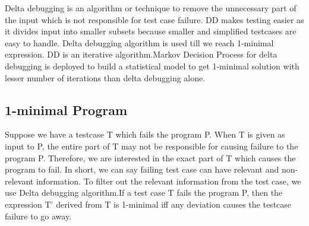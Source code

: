 \documentclass{relatorio}
\begin{document}
Delta debugging is an algorithm or technique to remove the unnecessary part of the input which is not responsible for test case failure. DD makes testing easier as it divides input into smaller subsets because smaller  and simplified testcases are easy to handle. Delta debugging algorithm is used till we reach 1-minimal expression. DD is an iterative algorithm.Markov Decision Process for delta debugging is deployed to build a statistical model to get 1-minimal solution with lesser number of iterations than delta debugging alone.


\subsection{1-minimal Program}%
\label{Tools}

Suppose we have a testcase T which fails the program P. When T is given as input to P, the entire part of T may not be responsible for causing failure to the program P. Therefore, we are interested in the exact part of T which causes the program to fail. In short, we can say failing test case can have relevant and non-relevant information. To filter out the relevant information from the test case, we use Delta debugging algorithm.If a test case T fails the program P, then the expression T’ derived from T is 1-minimal iff any deviation causes the testcase failure to go away.
\end{document}
